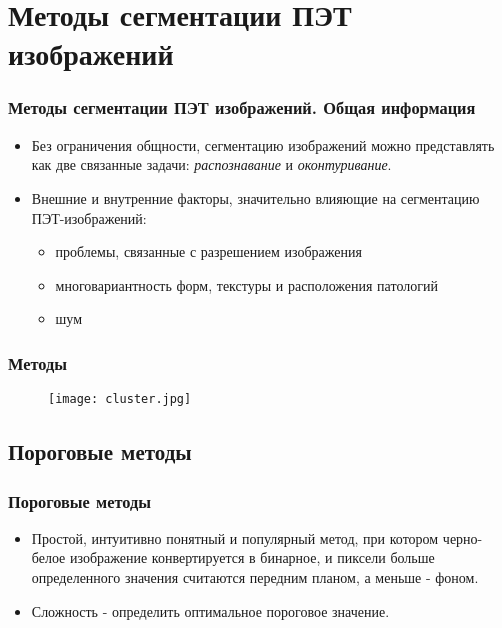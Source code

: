 \section{Методы сегментации ПЭТ изображений}
\begin{frame}
    \frametitle{Методы сегментации ПЭТ изображений. Общая информация}
    \begin{itemize}
        \item Без ограничения общности, сегментацию изображений
        можно представлять как две связанные задачи:
        \textit{распознавание} и \textit{оконтуривание}.
        \item Внешние и внутренние факторы, значительно
         влияющие на сегментацию ПЭТ-изображений:
         \begin{itemize}
             \item проблемы, связанные с разрешением изображения
             \item многовариантность форм, текстуры и расположения патологий
             \item шум
         \end{itemize}
        
    \end{itemize}
\end{frame}

\begin{frame}
    \frametitle{Методы}
    \begin{figure}
        \texttt{[image: cluster.jpg]}
    \end{figure}
\end{frame}


\subsection{Пороговые методы}
\begin{frame}
    \frametitle{Пороговые методы}
    \begin{itemize}
        \item Простой, интуитивно понятный и популярный метод,
        при котором черно-белое изображение конвертируется в бинарное, и пиксели больше определенного 
        значения считаются передним планом, а меньше - фоном.
        \item Сложность - определить оптимальное пороговое значение.        
    \end{itemize}
\end{frame}
